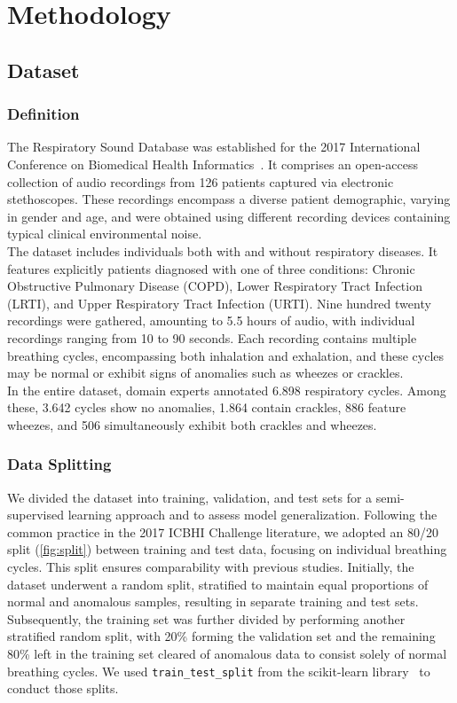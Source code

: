 \cleardoubleoddpage%
\chapter{Methodology}

\section{Dataset}
\subsection{Definition}
The Respiratory Sound Database was established for the 2017 International Conference on Biomedical Health Informatics~\cite{rocha2018alpha}. It comprises an open-access collection of audio recordings from 126 patients captured via electronic stethoscopes. These recordings encompass a diverse patient demographic, varying in gender and age, and were obtained using different recording devices containing typical clinical environmental noise.\\
The dataset includes individuals both with and without respiratory diseases. It features explicitly patients diagnosed with one of three conditions: Chronic Obstructive Pulmonary Disease (COPD), Lower Respiratory Tract Infection (LRTI), and Upper Respiratory Tract Infection (URTI). Nine hundred twenty recordings were gathered, amounting to 5.5 hours of audio, with individual recordings ranging from 10 to 90 seconds. Each recording contains multiple breathing cycles, encompassing both inhalation and exhalation, and these cycles may be normal or exhibit signs of anomalies such as wheezes or crackles.\\
In the entire dataset, domain experts annotated 6.898 respiratory cycles. Among these, 3.642 cycles show no anomalies, 1.864 contain crackles, 886 feature wheezes, and 506 simultaneously exhibit both crackles and wheezes.

\subsection{Data Splitting}
\label{method:data-splitting}
We divided the dataset into training, validation, and test sets for a semi-supervised learning approach and to assess model generalization. Following the common practice in the 2017 ICBHI Challenge literature, we adopted an 80/20 split (\autoref{fig:split}) between training and test data, focusing on individual breathing cycles. This split ensures comparability with previous studies.
Initially, the dataset underwent a random split, stratified to maintain equal proportions of normal and anomalous samples, resulting in separate training and test sets. Subsequently, the training set was further divided by performing another stratified random split, with 20\% forming the validation set and the remaining 80\% left in the training set cleared of anomalous data to consist solely of normal breathing cycles. We used \lstinline{train_test_split} from the scikit-learn library~\cite{pedregosa2011scikit} to conduct those splits.\\

